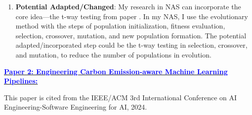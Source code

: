 \documentclass[11pt]{article}
\newcommand{\statement}[1]{\par\medskip
  \underline{\textcolor{blue}{\textbf{#1:}}}\space
}
\begin{document}
\begin{enumerate}
  \item  \textbf{Potential Adapted/Changed}: My research in \gls{NAS} can incorporate the core idea—the t-way testing from paper \cite{khadka2024combinatorial}. In my \gls{NAS}, I use the evolutionary method with the steps of population initialization, fitness evaluation, selection, crossover, mutation, and new population formation. The potential adapted/incorporated step could be the t-way testing in selection, crossover, and mutation,  to reduce the number of populations in evolution.
  
\end{enumerate}

\statement{Paper 2: Engineering Carbon Emission-aware Machine Learning Pipelines} 

This paper \cite{husom2024engineering} is cited from the IEEE/ACM 3rd International Conference on AI Engineering-Software Engineering for AI, 2024.
\end{document}
